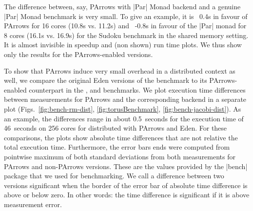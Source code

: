 The difference between, say, PArrows with |Par| Monad backend and a
genuine |Par|
Monad benchmark is very small. To give an example, it is ~0.4s in favour of PArrows for 16 cores (10.8s vs. 11.2s) and ~-0.8s in favour of the |Par| monad for 8 cores (16.1s vs. 16.9s) for
the Sudoku benchmark in the shared memory setting. It is almost invisible in speedup and
(non shown) run time plots. We thus show only the results for the
PArrows-enabled versions.

To show that PArrows induce very small overhead in a distributed context as well, we compare the original Eden
versions of the benchmark to its PArrows-enabled counterpart in the \rmtest, \torustest and \jacobitest benchmarks. We plot execution time differences between measurements for
PArrows and the corresponding backend in a separate plot
(Figs.~\ref{fig:bench-rm-dist}, \ref{fig:torusBenchmark}, \ref{fig:bench-jacobi-dist}). As an example, the differences range in
about 0.5~seconds for the execution time of 46~seconds on 256 cores
for distributed \rmtest with PArrows and Eden. For these comparisons, the plots show absolute
time differences that are not relative \wrt the total execution time.
Furthermore, the error bars ends were computed from pointwise maximum of both standard
deviations from both measurements for PArrows and non-PArrows
versions. These are the values provided by the |bench| package that we
used for benchmarking. We call a difference between two versions
significant when the border of the error bar of absolute time
difference is above or below zero. In other words: the time
difference is significant if it is above measurement error.

\subsubsection{\rmtest}\label{sec:rmtest}

\newcommand{\performanceSkelRMSM}[2]{
\performanceplot{Parallel run time of \rmtest ``#2''}{Eden CP, GpH, |Par| Monad}{16}{4}{
\addplot+ [very thick] table [scatter, x="nCores", y="time", col sep=comma, mark=none,
smooth]{benchmarks/sm-rm/bench-sm-rm.bench.skelrm-parr-eden-cp-#1-#2.csv};
\addplot+ [very thick] table [scatter, x="nCores", y="time", col sep=comma, mark=none,
smooth]{benchmarks/sm-rm/bench-sm-rm.bench.skelrm-parr-mult-#1-#2.csv};
\addplot+ [very thick] table [scatter, x="nCores", y="time", col sep=comma, mark=none,
smooth]{benchmarks/sm-rm/bench-sm-rm.bench.skelrm-parr-par-#1-#2.csv};
}{17}{\plotwidthSMP}
}

